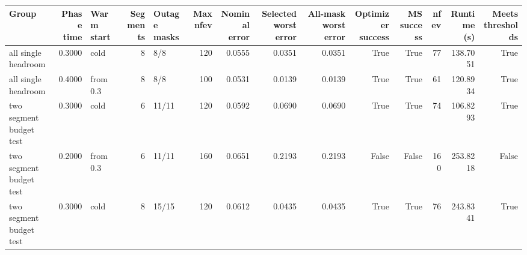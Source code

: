 \begin{tabular}{lrlrlrrrrrrrrr}
\toprule
Group & Phase time & Warm start & Segments & Outage masks & Max nfev & Nominal error & Selected worst error & All-mask worst error & Optimizer success & MS success & nfev & Runtime (s) & Meets thresholds \\
\midrule
all single headroom & 0.3000 & cold & 8 & 8/8 & 120 & 0.0555 & 0.0351 & 0.0351 & True & True & 77 & 138.7051 & True \\
all single headroom & 0.4000 & from 0.3 & 8 & 8/8 & 100 & 0.0531 & 0.0139 & 0.0139 & True & True & 61 & 120.8934 & True \\
two segment budget test & 0.3000 & cold & 6 & 11/11 & 120 & 0.0592 & 0.0690 & 0.0690 & True & True & 74 & 106.8293 & True \\
two segment budget test & 0.2000 & from 0.3 & 6 & 11/11 & 160 & 0.0651 & 0.2193 & 0.2193 & False & False & 160 & 253.8218 & False \\
two segment budget test & 0.3000 & cold & 8 & 15/15 & 120 & 0.0612 & 0.0435 & 0.0435 & True & True & 76 & 243.8341 & True \\
\bottomrule
\end{tabular}
